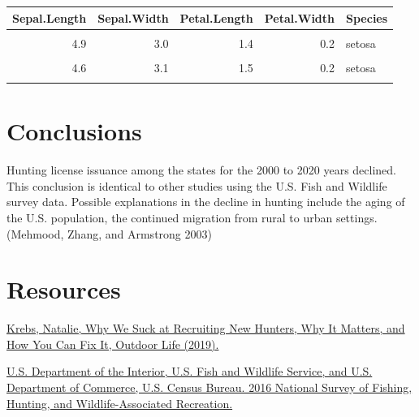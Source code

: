 \documentclass[]{tufte-handout}
\begin{document}
\begin{table}[H]
\centering
\begin{tabular}{r|r|r|r|l}
\hline
Sepal.Length & Sepal.Width & Petal.Length & Petal.Width & Species\\
\hline
\cellcolor{gray!6}{5.1} & \cellcolor{gray!6}{3.5} & \cellcolor{gray!6}{1.4} & \cellcolor{gray!6}{0.2} & \cellcolor{gray!6}{setosa}\\
\hline
4.9 & 3.0 & 1.4 & 0.2 & setosa\\
\hline
\cellcolor{gray!6}{4.7} & \cellcolor{gray!6}{3.2} & \cellcolor{gray!6}{1.3} & \cellcolor{gray!6}{0.2} & \cellcolor{gray!6}{setosa}\\
\hline
4.6 & 3.1 & 1.5 & 0.2 & setosa\\
\hline
\cellcolor{gray!6}{5.0} & \cellcolor{gray!6}{3.6} & \cellcolor{gray!6}{1.4} & \cellcolor{gray!6}{0.2} & \cellcolor{gray!6}{setosa}\\
\hline
\end{tabular}
\end{table}

\hypertarget{conclusions}{%
\section{Conclusions}\label{conclusions}}

Hunting license issuance among the states for the 2000 to 2020 years
declined. This conclusion is identical to other studies using the U.S.
Fish and Wildlife survey data. Possible explanations in the decline in
hunting include the aging of the U.S. population, the continued
migration from rural to urban settings. (Mehmood, Zhang, and Armstrong
2003)

\hypertarget{resources}{%
\section{Resources}\label{resources}}

\href{https://www.outdoorlife.com/why-we-are-losing-hunters-and-how-to-fix-it/}{Krebs,
Natalie, Why We Suck at Recruiting New Hunters, Why It Matters, and How
You Can Fix It, Outdoor Life (2019).}

\href{https://www.census.gov/content/dam/Census/library/publications/2018/demo/fhw16-nat.pdf}{U.S.
Department of the Interior, U.S. Fish and Wildlife Service, and U.S.
Department of Commerce, U.S. Census Bureau. 2016 National Survey of
Fishing, Hunting, and Wildlife-Associated Recreation.}
\end{document}
